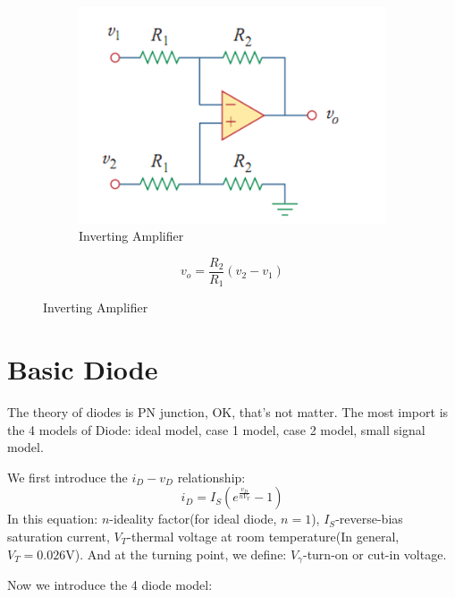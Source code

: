 \documentclass[a4paper,11pt,UTF8]{article}
\begin{document}
\begin{figure}[H]
	\begin{minipage}{.5\textwidth}
		\begin{figure}[H] 
			\centering 
			\includegraphics[scale=0.5]{./img/9.5.png}
			\caption{Inverting Amplifier}
		\end{figure}
	\end{minipage}
	\begin{minipage}{.5\textwidth}
		\LARGE{$$
			v_o=\frac{R_2}{R_1}(v_2-v_1)
			$$}
	\end{minipage}
\end{figure}
\section{Basic Diode}
The theory of diodes is PN junction, OK, that's not matter. The most import is the 4 models of Diode: ideal model, case 1 model, case 2 model, small signal model.

We first introduce the $i_D-v_D$ relationship:
$$
	i_D=I_S(e^{\frac{v_D}{nV_T}}-1)
$$
In this equation: $n$-ideality factor(for ideal diode, $n=1$), $I_S$-reverse-bias saturation current, $V_T$-thermal voltage at room temperature(In general, $V_T =0.026$V). And at the turning point, we define: $V_\gamma$-turn-on or cut-in voltage.

Now we introduce the 4 diode model:
\end{document}
